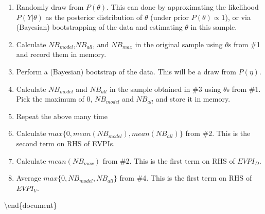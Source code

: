 \documentclass[
]{article}
\begin{document}
\begin{enumerate}
\item Randomly draw from $P(\theta)$. This can done by approximating the likelihood $P(Y|\theta)$ as the posterior distribution of $\theta$ (under prior $P(\theta) \propto 1$), or via (Bayesian) bootstrapping of the data and estimating $\theta$ in this sample.
\item Calculate $NB_{model}$,$NB_{all}$, and $NB_{max}$ in the original sample using $\theta$s from \#1 and record them in memory.  
\item Perform a (Bayesian) bootstrap of the data. This will be a draw from $P(\eta)$.
\item Calculate $NB_{model}$ and $NB_{all}$ in the sample obtained in \#3 using $\theta$s from \#1. Pick the maximum of 0, $NB_{model}$ and $NB_{all}$ and store it in memory.  
\item Repeat the above many time
\item Calculate $max\{0, mean(NB_{model}), mean(NB_{all})\}$ from \#2. This is the second term on RHS of EVPIs.
\item Calculate $mean(NB_{max})$ from \#2. This is the first term on RHS of $EVPI_D$.
\item Average $max\{0, NB_{model}, NB_{all}\}$ from \#4. This is the first term on RHS of $EVPI_V$.
\end{enumerate}

\textbackslash end\{document\}
\end{document}
